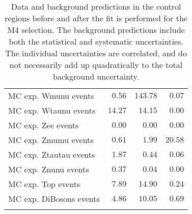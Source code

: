 \begin{table}
\begin{center}
{\begin{tabular*}{\textwidth}{@{\extracolsep{\fill}}lrrr}
        MC exp. Wmunu events         & $0.56$          & $143.78$          & $0.07$              \\
        MC exp. Wtaunu events         & $14.27$          & $14.15$          & $0.00$              \\
        MC exp. Zee events         & $0.00$          & $0.00$          & $0.00$              \\
        MC exp. Zmumu events         & $0.61$          & $1.99$          & $20.58$              \\
        MC exp. Ztautau events         & $1.87$          & $0.44$          & $0.06$              \\
        MC exp. Znunu events         & $0.37$          & $0.04$          & $0.00$              \\
        MC exp. Top events         & $7.89$          & $14.90$          & $0.24$              \\
        MC exp. DiBosons events         & $4.86$          & $10.05$          & $0.69$              \\
\noalign{\smallskip}\hline\noalign{\smallskip}
\end{tabular*}
}
\end{center}
\caption{Data and background predictions in the control regions before and after the fit is performed for the M4 selection.
  The background predictions include both the statistical and systematic uncertainties.
    The individual uncertainties are correlated, and do not necessarily add up
    quadratically to the total background uncertainty.
}
\label{tab:ControlRegion_M4}
\end{table}
%
